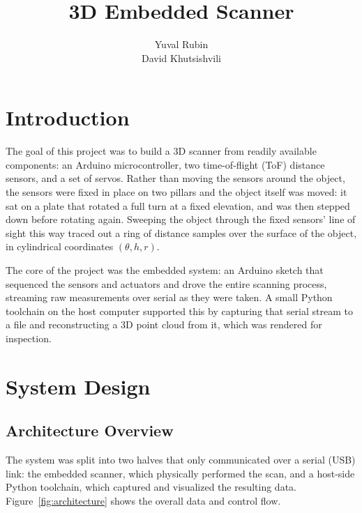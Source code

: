 \documentclass[11pt]{article}
\title{3D Embedded Scanner}
\author{Yuval Rubin \\ David Khutsishvili}
\date{}
\begin{document}
\maketitle
\tableofcontents
\newpage

\section{Introduction}

The goal of this project was to build a 3D scanner from
readily available components: an Arduino microcontroller, two
time-of-flight (ToF) distance sensors, and a set of servos. Rather
than moving the sensors around the object, the sensors were fixed in place
on two pillars and the object itself was moved: it sat on a plate that
rotated a full turn at a fixed elevation, and was then stepped down before
rotating again. Sweeping the object through the fixed sensors' line of
sight this way traced out a ring of distance samples over the surface of
the object, in cylindrical coordinates $(\theta, h, r)$.

The core of the project was the embedded system: an Arduino sketch
that sequenced the sensors and actuators and drove the entire scanning
process, streaming raw measurements over serial as they were taken. A
small Python toolchain on the host computer supported this by capturing
that serial stream to a file and reconstructing a 3D point cloud from it,
which was rendered for inspection.

\section{System Design}

\subsection{Architecture Overview}

The system was split into two halves that only communicated over a serial
(USB) link: the embedded scanner, which physically performed the scan, and
a host-side Python toolchain, which captured and visualized the resulting
data. Figure~\ref{fig:architecture} shows the overall data and control
flow.
\end{document}
